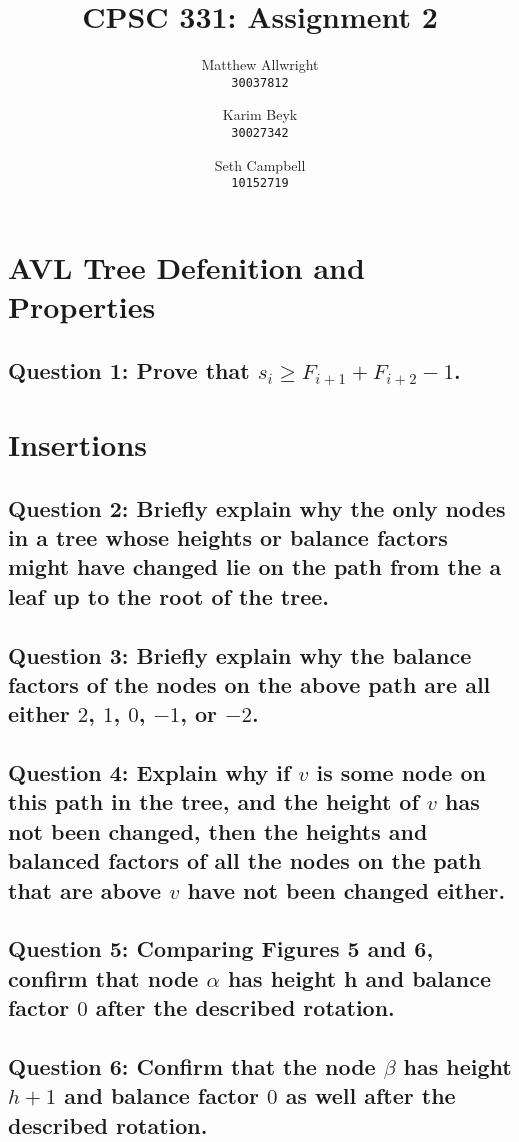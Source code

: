 \documentclass[a4paper, 12pt, titlepage]{article}
\title{CPSC 331: Assignment 2}
\author{
  Matthew Allwright\\
  \texttt{30037812}
  \and
  Karim Beyk\\
  \texttt{30027342}
  \and
  Seth Campbell\\
  \texttt{10152719}
}
\begin{document}
\maketitle

\section*{AVL Tree Defenition and Properties}

\subsection*{Question 1: Prove that $s_i \geq F_{i+1}+F_{i+2}-1$.}

\section*{Insertions}

\subsection*{Question 2: Briefly explain why the only nodes in a tree whose heights or balance factors might
have changed lie on the path from the a leaf up to the root of the tree.} 

\subsection*{Question 3: Briefly explain why the balance factors of the nodes on the above path are all either $2$, $1$, $0$, $-1$, or $-2$.} 

\subsection*{Question 4: Explain why if $v$ is some node on this path in the tree, and the height of $v$ has not been changed, then the heights and balanced factors of all the nodes on the path that are above $v$ have not been changed either.} 

\subsection*{Question 5: Comparing Figures 5 and 6, confirm that node $\alpha$ has height h and balance factor $0$ after the described rotation.} 

\subsection*{Question 6: Confirm that the node $\beta$ has height $h+1$ and balance factor $0$ as well after the described rotation.} 
\end{document}
